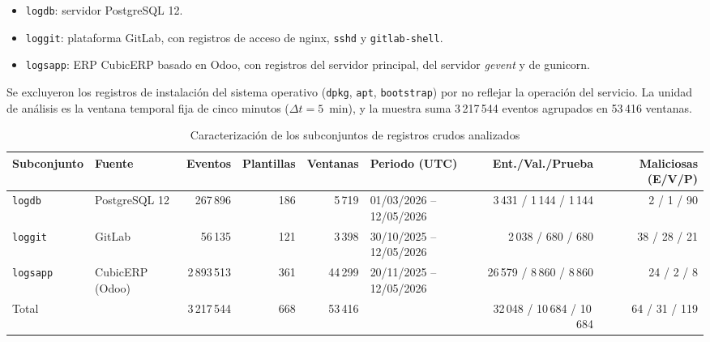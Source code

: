 \documentclass[jou,a4paper,floatsintext,donotrepeattitle]{apa7}
\begin{document}
\begin{itemize}
  \item \texttt{logdb}: servidor PostgreSQL 12.
  \item \texttt{loggit}: plataforma GitLab, con registros de acceso de nginx, \texttt{sshd} y \texttt{gitlab-shell}.
  \item \texttt{logsapp}: ERP CubicERP basado en Odoo, con registros del servidor principal, del servidor \textit{gevent} y de gunicorn.
\end{itemize}

Se excluyeron los registros de instalación del sistema operativo (\texttt{dpkg}, \texttt{apt}, \texttt{bootstrap}) por no reflejar la operación del servicio. La unidad de análisis es la ventana temporal fija de cinco minutos ($\Delta t = 5$~min), y la muestra suma 3\,217\,544 eventos agrupados en 53\,416 ventanas.

\begin{table}[t]
\caption{Caracterización de los subconjuntos de registros crudos analizados}
\label{tab:datos}
\centering
\footnotesize\setlength{\tabcolsep}{2.5pt}
\begin{tabular}{@{}llrrrlrr@{}}
\toprule
Subconjunto & Fuente & Eventos & Plantillas & Ventanas & Periodo (UTC) & Ent./Val./Prueba & Maliciosas (E/V/P) \\
\midrule
\texttt{logdb}   & PostgreSQL 12   & 267\,896   & 186 & 5\,719  & 01/03/2026 -- 12/05/2026 & 3\,431 / 1\,144 / 1\,144 & 2 / 1 / 90 \\
\texttt{loggit}  & GitLab          & 56\,135    & 121 & 3\,398  & 30/10/2025 -- 12/05/2026 & 2\,038 / 680 / 680      & 38 / 28 / 21 \\
\texttt{logsapp} & CubicERP (Odoo) & 2\,893\,513 & 361 & 44\,299 & 20/11/2025 -- 12/05/2026 & 26\,579 / 8\,860 / 8\,860 & 24 / 2 / 8 \\
\midrule
Total            &                 & 3\,217\,544 & 668 & 53\,416 &                          & 32\,048 / 10\,684 / 10\,684 & 64 / 31 / 119 \\
\bottomrule
\end{tabular}
\end{table}
\end{document}
